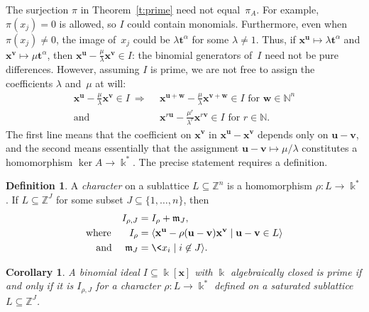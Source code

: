 \documentclass[12pt]{amsart}
\numberwithin{equation}{section}
\newtheorem{cor}[thm]{Corollary}
\theoremstyle{definition}
\newtheorem{defn}[thm]{Definition}
\begin{document}
The surjection $\pi$ in Theorem~\ref{t:prime} need not equal~$\pi_A$.
For example, $\pi(x_j) = 0$ is allowed, so $I$ could contain
monomials.  Furthermore, even when $\pi(x_j) \neq 0$, the image
of~$x_j$ could be $\lambda{{\mathbf{t}}}^\alpha$ for some $\lambda \neq 1$.
Thus, if ${\mathbf{x}}^{\mathbf{u}} \mapsto \lambda{{\mathbf{t}}}^\alpha$ and ${\mathbf{x}}^{\mathbf{v}} \mapsto
\mu{{\mathbf{t}}}^\alpha$, then ${\mathbf{x}}^{\mathbf{u}} - \frac\mu\lambda{\mathbf{x}}^{\mathbf{v}} \in I$: the
binomial generators of~$I$ need not be pure differences.  However,
assuming $I$ is prime, we are not free to assign the coefficients
$\lambda$ and~$\mu$ at will:
\begin{align*}\textstyle
  {\mathbf{x}}^{\mathbf{u}} - \frac\mu\lambda{\mathbf{x}}^{\mathbf{v}} \in I\ {\Longrightarrow}&\ \ \textstyle
  {\mathbf{x}}^{{\mathbf{u}}+{\mathbf{w}}}-\frac\mu\lambda{\mathbf{x}}^{{\mathbf{v}}+{\mathbf{w}}}\in I\text{ for }{\mathbf{w}}\in{\mathbb{N}}^n
\\\text{and}&\ \ \textstyle
  {\mathbf{x}}^{r{\mathbf{u}}} - \frac{\mu^r}{\lambda^r}{\mathbf{x}}^{r{\mathbf{v}}} \in I\text{ for }r\in{\mathbb{N}}.
\end{align*}
The first line means that the coefficient on ${\mathbf{x}}^{\mathbf{v}}$ in
${\mathbf{x}}^{\mathbf{u}}-{\mathbf{x}}^{\mathbf{v}}$ depends only on ${\mathbf{u}}-{\mathbf{v}}$, and the second means
essentially that the assignment ${\mathbf{u}}-{\mathbf{v}} \mapsto \mu/\lambda$
constitutes a homomorphism $\ker A \to {\Bbbk}^*$.  The precise statement
requires a definition.

\begin{defn}\label{d:IrhoJ}
A \emph{character} on a sublattice $L \subseteq {\mathbb{Z}}^n$ is a
homomorphism $\rho: L \to {\Bbbk}^*$.  If $L \subseteq {\mathbb{Z}}^J$ for some
subset $J \subseteq \{1,\ldots,n\}$, then
\begin{align*}
  I_{\rho,J} &= I_\rho + {\mathfrak{m}}_J,
\\\text{where }\quad\ \,
  I_\rho &= {\langle}{\mathbf{x}}^{\mathbf{u}} - \rho({\mathbf{u}}-{\mathbf{v}}){\mathbf{x}}^{\mathbf{v}} \mid {\mathbf{u}}-{\mathbf{v}} \in L{\rangle}
\\\text{and }\quad
  {\mathfrak{m}}_J &= \<x_i \mid i \not\in J{\rangle}.
\end{align*}
\end{defn}

\begin{cor}\label{c:prime}
A binomial ideal $I \subseteq {\Bbbk}[{\mathbf{x}}]$ with ${\Bbbk}$ algebraically
closed is prime if and only if it is $I_{\rho,J}$ for a character
$\rho: L \to {\Bbbk}^*$ defined on a saturated sublattice $L \subseteq
{\mathbb{Z}}^J$.
\end{cor}
\end{document}
